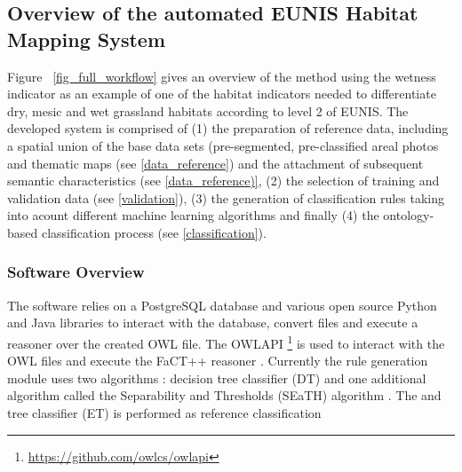 \documentclass[authoryear, review,12pt,number]{elsarticle}
\begin{document}
\subsection{Overview of the automated EUNIS Habitat Mapping System}
 Figure ~\ref{fig_full_workflow} gives an overview of the method using the
 wetness indicator as an example of one of the habitat indicators needed to
 differentiate dry, mesic and wet grassland habitats according to level 2 of
 EUNIS. 
The developed system is comprised of (1) the preparation of reference data,
including a spatial union of the base data sets (pre-segmented,
pre-classified areal photos and thematic maps (see \ref{data_reference}) and the attachment
of subsequent semantic characteristics (see \ref{data_reference)}, (2) the
selection of training and validation data (see \ref{validation}), (3) the
generation of classification rules taking into acount different machine
learning algorithms and finally (4) the ontology-based classification process
(see \ref{classification}).
\label{subsec_software}
\subsubsection{Software Overview}
The software relies on a PostgreSQL database and various open source Python and 
Java libraries to interact with the database, convert files and execute a 
reasoner over the created OWL file.
The OWLAPI \footnote{\url{https://github.com/owlcs/owlapi}} is used to interact 
with the OWL files and execute the FaCT++
reasoner \citep{Tsarkov2006}. Currently the rule generation module uses two 
algorithms %
: decision tree classifier (DT) and one additional algorithm called the Separability and 
Thresholds (SEaTH) algorithm \citep{Nussbaum2006}. The and tree 
classifier (ET) %
is performed as reference classification
\end{document}
